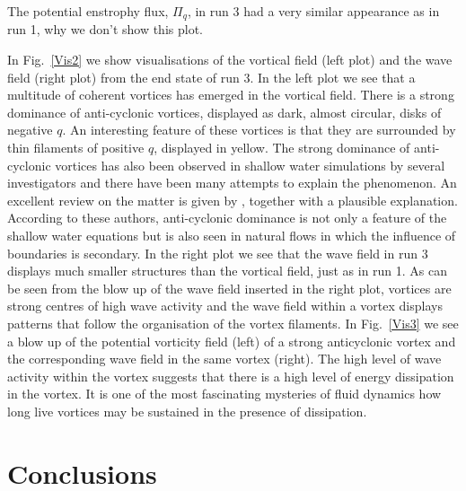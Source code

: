 The  potential enstrophy flux, $ \Pi_q $,  in run 3 had a very similar appearance as in run 1, why we don't show this plot.



In Fig.~\ref{Vis2} we show visualisations of the vortical field (left plot) and the wave field (right plot) from the end state of run 3. In the left plot we see that a multitude of coherent vortices has emerged in the vortical field. There is a strong dominance of anti-cyclonic vortices, displayed as dark,  almost circular,  disks of negative $ q $. An interesting feature of these vortices is that they are surrounded by  thin filaments of positive $ q $, displayed in yellow. The strong dominance of anti-cyclonic vortices has also been observed in shallow water  simulations by several investigators  \citep{Cushman1990, Arai1994, Polvani1994, Cho1996} and there have been many attempts to explain the phenomenon. An excellent review on the matter is given by \citet{Graves2006}, together with a plausible explanation. According to these authors, anti-cyclonic dominance is not only a feature of the shallow water equations but is also seen in natural flows in which the influence of boundaries is secondary. In the right plot we see that the wave field in run 3 displays much smaller structures than the vortical field, just as in run 1.  As can be seen from the blow up of the wave field inserted in the right plot, vortices are strong centres of high wave activity and the wave field within a vortex displays patterns that follow the organisation of the vortex filaments.  In Fig.~\ref{Vis3} we see a blow up of the potential vorticity field (left) of a strong anticyclonic vortex and the corresponding wave field in the same vortex (right). The high level of wave activity within the vortex suggests that there is a high level of energy dissipation in the vortex.  It is one of the most fascinating mysteries of fluid dynamics how  long live vortices may be sustained in the presence of dissipation.

 \section{Conclusions}


